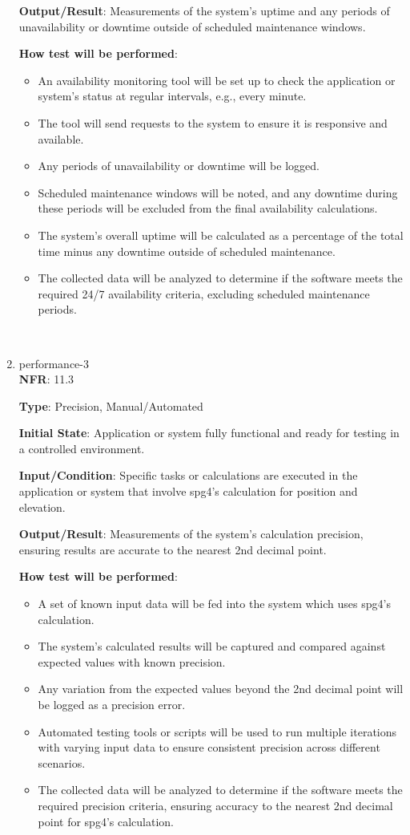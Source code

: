 \documentclass[12pt, titlepage]{article}
\begin{document}
\begin{enumerate}
\textbf{Output/Result}: Measurements of the system's uptime and any periods of unavailability or downtime outside of scheduled maintenance windows.

\textbf{How test will be performed}: 
\begin{itemize}[noitemsep]
    \item An availability monitoring tool will be set up to check the application or system's status at regular intervals, e.g., every minute.
    \item The tool will send requests to the system to ensure it is responsive and available.
    \item Any periods of unavailability or downtime will be logged.
    \item Scheduled maintenance windows will be noted, and any downtime during these periods will be excluded from the final availability calculations.
    \item The system's overall uptime will be calculated as a percentage of the total time minus any downtime outside of scheduled maintenance.
    \item The collected data will be analyzed to determine if the software meets the required 24/7 availability criteria, excluding scheduled maintenance periods.
\end{itemize}\\

\item{performance-3 \\}
\textbf{NFR}: 11.3

\textbf{Type}: Precision, Manual/Automated

\textbf{Initial State}: Application or system fully functional and ready for testing in a controlled environment.

\textbf{Input/Condition}: Specific tasks or calculations are executed in the application or system that involve spg4's calculation for position and elevation.

\textbf{Output/Result}: Measurements of the system's calculation precision, ensuring results are accurate to the nearest 2nd decimal point.

\textbf{How test will be performed}: 
\begin{itemize}[noitemsep]
    \item A set of known input data will be fed into the system which uses spg4's calculation.
    \item The system's calculated results will be captured and compared against expected values with known precision.
    \item Any variation from the expected values beyond the 2nd decimal point will be logged as a precision error.
    \item Automated testing tools or scripts will be used to run multiple iterations with varying input data to ensure consistent precision across different scenarios.
    \item The collected data will be analyzed to determine if the software meets the required precision criteria, ensuring accuracy to the nearest 2nd decimal point for spg4's calculation.
\end{itemize}\\


\end{enumerate}
\end{document}
